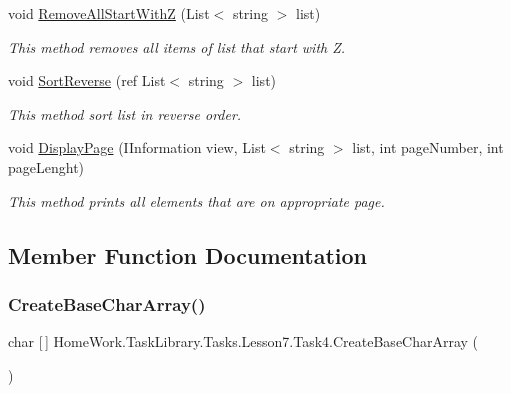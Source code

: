 \begin{DoxyCompactItemize}
void \mbox{\hyperlink{class_home_work_1_1_task_library_1_1_tasks_1_1_lesson7_1_1_task4_a7708d136ddb289d7d4ad178d1b794e68}{Remove\+All\+Start\+WithZ}} (List$<$ string $>$ list)
\begin{DoxyCompactList}\small\item\em This method removes all items of list that start with \textquotesingle{}Z\textquotesingle{}. \end{DoxyCompactList}\item 
void \mbox{\hyperlink{class_home_work_1_1_task_library_1_1_tasks_1_1_lesson7_1_1_task4_abd6629495c092b9558a056c14dc268f4}{Sort\+Reverse}} (ref List$<$ string $>$ list)
\begin{DoxyCompactList}\small\item\em This method sort list in reverse order. \end{DoxyCompactList}\item 
void \mbox{\hyperlink{class_home_work_1_1_task_library_1_1_tasks_1_1_lesson7_1_1_task4_a83edb6de00e905d55ac3432b1b1d765f}{Display\+Page}} (I\+Information view, List$<$ string $>$ list, int page\+Number, int page\+Lenght)
\begin{DoxyCompactList}\small\item\em This method prints all elements that are on appropriate page. \end{DoxyCompactList}\end{DoxyCompactItemize}


\subsection{Member Function Documentation}
\mbox{\label{class_home_work_1_1_task_library_1_1_tasks_1_1_lesson7_1_1_task4_a4765a8b3613eaa42247fc911cb2484af}} 
\subsubsection{\texorpdfstring{CreateBaseCharArray()}{CreateBaseCharArray()}}
{\footnotesize\ttfamily char \mbox{[}$\,$\mbox{]} Home\+Work.\+Task\+Library.\+Tasks.\+Lesson7.\+Task4.\+Create\+Base\+Char\+Array (\begin{DoxyParamCaption}{ }\end{DoxyParamCaption})\hspace{0.3cm}{\ttfamily [private]}}



